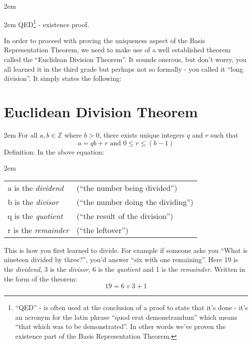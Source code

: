 \documentclass{article}
\newenvironment{jprIn}{\begin{adjustwidth}{2em}{}}{\end{adjustwidth}}
\begin{document}
\begin{jprIn}
\begin{jprIn}
QED\footnote{``QED'' - is often used at the conclusion of a proof to state that it’s
done - it’s an acronym for the latin phrase ``quod erat demonstrandum'' which means ``that which was to be demonstrated''.
In other words we’ve proven the existence part of the Basis Representation Theorem.} - existence proof.
\end{jprIn}
\end{jprIn}
\bigskip

\break
In order to proceed
% 
% 
with proving the uniqueness aspect of the Basis Representation Theorem, we
need to make use of a well established theorem
called the ``Euclidean Division Theorem''.
It sounds onerous, but don’t worry, you all learned it
in the third grade but perhaps not so formally - you called it ``long division''. It simply states the following:

\section*{Euclidean Division Theorem}
\begin{jprIn}
For all $a,b\in{}\mathbb{Z}$ where $b>0$, there exists unique integers $q$ and $r$ such
that
\[a=qb+r  \text{ and } 0\le{}r\le{}(b-1)\]
Definition: In the above equation:
\begin{jprIn}
\begin{tabular}{l l}
a is the \emph{dividend} & (``the number being divided'')\\
b is the \emph{divisor} & (``the number doing the dividing'')\\
q is the \emph{quotient} & (``the result of the division'')\\
r is the \emph{remainder} & (``the leftover'')
\end{tabular}
\end{jprIn}
\end{jprIn}
This is how you first learned to divide.
For example if someone asks you ``What is nineteen divided by three?'', you’d
answer ``six with one remaining''. Here 19 is the \emph{dividend},  3 is the \emph{divisor},
6 is the \emph{quotient} and 1 is the \emph{remainder}. Written in the form of the theorem:
\[19=6\times3+1\]
\end{document}
